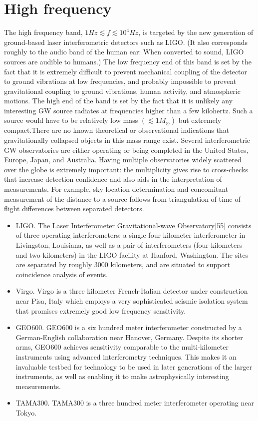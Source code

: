 \documentclass[binding=0.6cm, LaM]{sapthesis}
\begin{document}
\section{High frequency}
The high frequency band, $1Hz \apprle f \apprle 10^4 Hz$, is targeted by the new generation of ground-based laser interferometric detectors such as LIGO.
(It also corresponds roughly to the audio band of the human ear: When converted to sound, LIGO sources are audible to humans.)
The low frequency end of this band is set by the fact that it is extremely difficult to prevent mechanical coupling of the detector to ground vibrations at low frequencies,
and probably impossible to prevent gravitational coupling to ground vibrations, human activity, and atmospheric motions.
The high end of the band is set by the fact that it is unlikely any interesting GW source radiates at frequencies higher than a few kilohertz. Such a source would have to be relatively
low mass $(\apprle 1M_{\odot})$ but extremely compact.There are no known theoretical or observational indications that gravitationally collapsed objects in this mass range exist.
Several interferometric GW observatories are either operating or being completed in the United States, Europe, Japan, and Australia.
Having multiple observatories widely scattered over the globe is extremely important: the multiplicity gives rise to cross-checks that increase detection confidence and also aids in the interpretation
 of measurements. For example, sky location determination and concomitant measurement of the distance to a source follows from triangulation of time-of-flight differences between separated detectors.
\begin{itemize}
  \item LIGO. The Laser Interferometer Gravitational-wave Observatory[55] consists of three operating interferometers:
a single four kilometer interferometer in Livingston, Louisiana, as well as a pair of interferometers (four kilometers and two kilometers) in the LIGO facility at Hanford, Washington.
The sites are separated by roughly 3000 kilometers, and are situated to support coincidence analysis of events.
  \item Virgo. Virgo is a three kilometer French-Italian detector under construction near Pisa, Italy which employs a very sophisticated seismic isolation system that promises extremely good low
frequency sensitivity.
  \item GEO600. GEO600 is a six hundred meter interferometer constructed by a German-English collaboration near Hanover, Germany.
 Despite its shorter arms, GEO600 achieves sensitivity comparable to the multi-kilometer instruments using advanced interferometry techniques.
 This makes it an invaluable testbed for technology to be used in later generations of the larger instruments, as well as enabling it to make astrophysically interesting measurements.
  \item TAMA300. TAMA300 is a three hundred meter interferometer operating near Tokyo.

\end{itemize}
\end{document}
